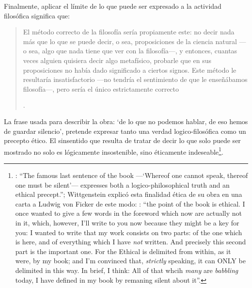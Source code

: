 Finalmente, aplicar el límite de lo que puede ser expresado a la actividad filosófica significa que: \blockquote[{\Cite[\S6.53]{wittgenstein1922tractatuses}}.]{El método correcto de la filosofía sería propiamente este: no decir nada más que lo que se puede decir, o sea, proposiciones de la ciencia natural ---o sea, algo que nada tiene que ver con la filosofía---, y entonces, cuantas veces alguien quisiera decir algo metafísico, probarle que en sus proposiciones no había dado significado a ciertos signos. Este método le resultaría insatisfactorio ---no tendría el sentimiento de que le enseñábamos filosofía---, pero sería el único estrictamente correcto}. La frase usada para describir la obra: \enquote*{de lo que no podemos hablar, de eso hemos de guardar silencio}, pretende expresar tanto una verdad logico-filosófica como un precepto ético. El sinsentido que resulta de tratar de decir lo que solo puede ser mostrado no solo es lógicamente insostenible, sino éticamente indeseable\footnote{\cite[Cf.][156]{monk1991duty}: \enquote{The famous last sentence of the book ---`Whereof one cannot speak, thereof one must be silent'--- expresses both a logico-philosophical truth and an ethical precept.}; Wittgenstein explicó esta finalidad ética de su obra en una carta a Ludwig von Ficker de este modo: \cite[22-23]{monk2005howto}: \enquote{the point of the book is ethical. I once wanted to give a few words in the foreword which now are actually not in it, which, however, I'll write to you now because they might be a key for you: I wanted to write that my work consists on two parts: of the one which is here, and of everything which I have \emph{not} written. And precisely this second part is the important one. For the Ethical is delimited from within, as it were, by my book; and I'm convinced that, \emph{strictly} speaking, it can ONLY be delimited in this way. In brief, I think: All of that whcih \emph{many} are \emph{babbling} today, I have defined in my book by remaning silent about it}.}.
